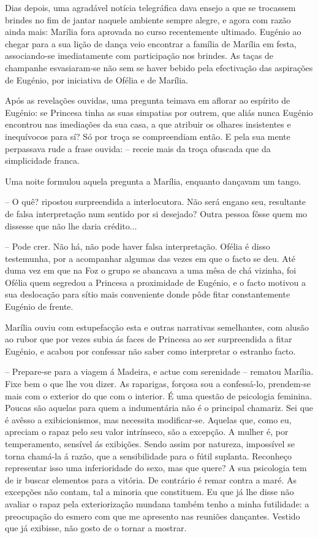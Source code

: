 \documentclass[9pt]{article}
\begin{document}
Dias depois, uma a\-gra\-dá\-vel notícia telegráfi\-ca dava ensejo a que se trocassem brindes no fim de jantar naquele ambiente sempre alegre, e agora com
razão ainda mais: Marília fora aprovada no curso recentemente ultimado. Eugé\-nio ao chegar para a sua li\-ção de dan\-ça veio encontrar a fa\-mí\-lia de Marília em festa, associando-se imediatamente com participa\-ção nos brindes. As
taças de champanhe esvasiaram-se não sem se haver bebido pela efectiva\-ção
das aspira\-ções de Eugé\-nio, por ini\-cia\-tiva de Ofélia e de Marília.

Após as revela\-ções ouvidas, uma pregunta teimava em aflorar ao espírito
de Eugé\-nio: se Princesa tinha as suas simpatias por outrem, que aliás
nunca Eugé\-nio encontrou nas imedia\-ções da sua casa, a que atribuir os o\-lhares
insistentes e inequívocos para sí? Só por troça se compreendiam então. E
pela sua mente perpassava rude a frase ouvida: -- receie mais da troça ofuscada que da simplicidade franca.

Uma noite formulou aquela pregunta a Marília, enquanto dan\-çavam um tango.

-- O quê? ripostou surpreendida a interlocutora. Não será engano seu,
resultante de falsa interpreta\-ção num sentido por si desejado? Outra pessoa
fôsse quem mo dissesse que não lhe daria crédito...

-- Pode crer. Não há, não pode haver falsa interpreta\-ção. Ofélia é disso
testemunha, por a acompanhar algumas das vezes em que o facto se deu. Até
duma vez em que na Foz o grupo se abancava a uma mêsa de chá vizinha, foi
Ofélia quem segredou a Princesa a proximidade de Eugé\-nio, e o facto motivou
a sua desloca\-ção para sítio mais conveniente donde pôde fitar constantemente Eugé\-nio de frente.

Marília ouviu com estupefac\-ção esta e outras narrativas seme\-lhantes,
com alusão ao rubor que por vezes subia ás faces de Princesa ao ser surpreendida a fitar Eugé\-nio, e acabou por confessar não saber como interpretar o
estranho facto.

-- Prepare-se para a viagem á Madeira, e actue com serenidade -- rematou
Marília. Fixe bem o que lhe vou dizer. As raparigas, forçosa sou a confessá-lo,
pren\-dem-se mais com o exterior do que com o interior. É uma questão de psicologia feminina. Poucas são aquelas para quem a indumentária não é o principal chamariz. Sei que é avêsso a exibicionismos, mas necessita modifi\-car-se.
Aquelas que, como eu, apreciam o rapaz pelo seu valor intrínseco, são a excep\-ção.
A mu\-lher é, por temperamento, sensível ás exibi\-ções. Sendo assim por
natureza, impossível se torna chamá-la á razão, que a sensibilidade para o
fútil suplanta. Reconheço representar isso uma inferioridade do sexo, mas
que quere? A sua psicologia tem de ir buscar elementos para a vitória. De
contrário é remar contra a maré. As excep\-ções não contam, tal a minoria que
constituem. Eu que já lhe disse não avaliar o rapaz pela exterioriza\-ção
mundana também tenho a minha futilidade: a preocupa\-ção do esmero com que
me apresento nas reuniões dan\-çantes. Vestido que já exibisse, não gosto de o
tornar a mostrar.
\end{document}
